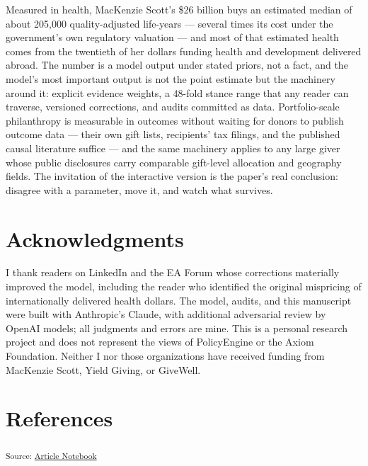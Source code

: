 \documentclass[
  11pt,
  letterpaper,
  DIV=11,
  numbers=noendperiod]{scrartcl}
\begin{document}
Measured in health, MacKenzie Scott's \$26 billion buys an estimated
median of about 205,000 quality-adjusted life-years --- several times
its cost under the government's own regulatory valuation --- and most of
that estimated health comes from the twentieth of her dollars funding
health and development delivered abroad. The number is a model output
under stated priors, not a fact, and the model's most important output
is not the point estimate but the machinery around it: explicit evidence
weights, a 48-fold stance range that any reader can traverse, versioned
corrections, and audits committed as data. Portfolio-scale philanthropy
is measurable in outcomes without waiting for donors to publish outcome
data --- their own gift lists, recipients' tax filings, and the
published causal literature suffice --- and the same machinery applies
to any large giver whose public disclosures carry comparable gift-level
allocation and geography fields. The invitation of the interactive
version is the paper's real conclusion: disagree with a parameter, move
it, and watch what survives.

\section*{Acknowledgments}\label{acknowledgments}

I thank readers on LinkedIn and the EA Forum whose corrections
materially improved the model, including the reader who identified the
original mispricing of internationally delivered health dollars. The
model, audits, and this manuscript were built with Anthropic's Claude,
with additional adversarial review by OpenAI models; all judgments and
errors are mine. This is a personal research project and does not
represent the views of PolicyEngine or the Axiom Foundation. Neither I
nor those organizations have received funding from MacKenzie Scott,
Yield Giving, or GiveWell.

\section*{References}\label{references}

\textsubscript{Source:
\href{https://MaxGhenis.github.io/mackenzie-scott-qaly/index.qmd.html}{Article
Notebook}}
\end{document}
